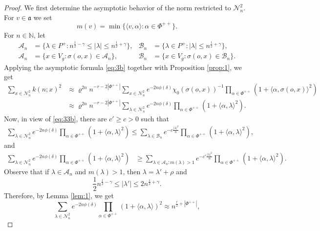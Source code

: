 \documentclass[11pt]{amsart}
\newcommand{\NN}{\mathbb{N}}
\newcommand{\calB}{\mathcal{B}}
\newcommand{\calA}{\mathcal{A}}
\newcommand{\calN}{\mathcal{N}}
\newcommand{\scrA}{\mathscr{A}}
\newcommand{\scrB}{\mathscr{B}}
\newcommand{\scrN}{\mathscr{N}}
\newcommand{\sprod}[2]{\langle {#1}, {#2} \rangle}
\theoremstyle{plain}
\theoremstyle{definition}
\numberwithin{equation}{section}
\begin{document}
\begin{proof} 
	We first determine the asymptotic behavior of the norm restricted to $\calN_n^2$. For $v \in \mathfrak{a}$ we set
	\[
		m(v) = \min \big\{\sprod{v}{\alpha} : \alpha  \in \Phi^{++}\big\}.
	\]
	For $n \in \NN$, let
	\begin{align*}
		\calA_n &= \Big\{\lambda \in P^+ : n^{\frac{1}{2}-\gamma} \leqslant |\lambda| \leqslant n^{\frac12+\gamma} \Big\},
		&\calB_n &= \Big\{\lambda \in P^+: |\lambda| \leqslant n^{\frac12+\gamma} \Big\}, \\
		\scrA_n &= \{x \in V_g : \sigma(o, x) \in \calA_n\}, 
		&\scrB_n &= \{x \in V_g : \sigma(o, x) \in \calB_n\}. 
	\end{align*}
	Applying the asymptotic formula \eqref{eq:3b} together with Proposition \ref{prop:1}, we get
	\begin{align*}
		\sum_{x \in \scrN_n^2} k(n; x)^2 
		&\approx
		\varrho^{2n} n^{-r - 2 |\Phi^{++}|} 
		\sum_{x \in \scrN_n^2} e^{- 2 n \phi(\delta)} \chi_0(\sigma(o, x))^{-1} 
		\prod_{\alpha \in \Phi^{++}} (1 + \sprod{\alpha}{\sigma(o, x)}^2)  \\
		&\approx
		\varrho^{2n} n^{-r - 2 |\Phi^{++}|} 
		\sum_{\lambda \in \calN_n^2} 
		e^{-2 n \phi(\delta)} \prod_{\alpha \in \Phi^{++}} (1 + \sprod{\alpha}{\lambda}^2).
	\end{align*}
	Now, in view of \eqref{eq:33b}, there are $c' \geqslant c > 0$ such that 
	\begin{align*}
		\sum_{\lambda \in \calN_n^2} 
		e^{-2 n \phi(\delta)} \prod_{\alpha \in \Phi^{++}} 
		(1 + \sprod{\alpha}{\lambda}^2)
		\leqslant
		\sum_{\lambda \in \calB_n} e^{-c \frac{|\lambda|^2}{n}}
		\prod_{\alpha \in \Phi^{++}}
		(1 + \sprod{\alpha}{\lambda}^2),
	\end{align*}
	and
	\begin{align*}
		\sum_{\lambda \in \calN_n^2} 
		e^{-2 n \phi(\delta)} \prod_{\alpha \in \Phi^{++}} (1 + \sprod{\alpha}{\lambda}^2)
		&\geqslant
		\sum_{\lambda \in \calA_n : m(\lambda) > 1 } e^{-c' \frac{|\lambda|^2}{n}}
		\prod_{\alpha \in \Phi^{++}}
		(1 + \sprod{\alpha}{\lambda}^2).
	\end{align*}
	Observe that if $\lambda \in \calA_n$ and $m(\lambda) > 1$, then $\lambda = \lambda' + \rho$ and 
	\[
		\frac{1}{2} n^{\frac12-\gamma} \leqslant |\lambda'| \leqslant 2 n^{\frac12+\gamma}.
	\]
	Therefore, by Lemma \ref{lem:1}, we get
	\[
		\sum_{\lambda \in \calN_n^2} 
		e^{-2 n \phi(\delta)} \prod_{\alpha \in \Phi^{++}} (1 + \sprod{\alpha}{\lambda})^2
		\approx
		n^{\frac{r}{2} + |\Phi^{++}|},
\]
\end{proof}
\end{document}

